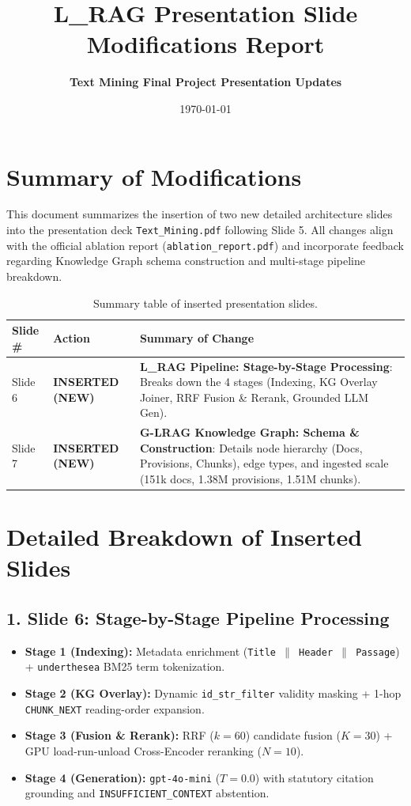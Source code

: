 \documentclass[10pt]{article}
\title{\vspace{-0.5cm}\textbf{\Large L\_RAG Presentation Slide Modifications Report}}
\author{\textbf{Text Mining Final Project Presentation Updates}}
\date{\today}
\begin{document}
\maketitle
\vspace{-0.3cm}

\section*{Summary of Modifications}
This document summarizes the insertion of two new detailed architecture slides into the presentation deck \texttt{Text\_Mining.pdf} following Slide 5. All changes align with the official ablation report (\texttt{ablation\_report.pdf}) and incorporate feedback regarding Knowledge Graph schema construction and multi-stage pipeline breakdown.

\begin{table}[h!]
\centering
\small
\begin{tabular}{lp{3.2cm}p{9cm}}
\toprule
\textbf{Slide \#} & \textbf{Action} & \textbf{Summary of Change} \\
\midrule
Slide 6 & \textbf{INSERTED (NEW)} & \textbf{L\_RAG Pipeline: Stage-by-Stage Processing}: Breaks down the 4 stages (Indexing, KG Overlay Joiner, RRF Fusion \& Rerank, Grounded LLM Gen). \\
Slide 7 & \textbf{INSERTED (NEW)} & \textbf{G-LRAG Knowledge Graph: Schema \& Construction}: Details node hierarchy (Docs, Provisions, Chunks), edge types, and ingested scale (151k docs, 1.38M provisions, 1.51M chunks). \\
\bottomrule
\end{tabular}
\caption{Summary table of inserted presentation slides.}
\end{table}

\vspace{-0.2cm}
\section*{Detailed Breakdown of Inserted Slides}

\subsection*{1. Slide 6: Stage-by-Stage Pipeline Processing}
\begin{itemize}
    \item \textbf{Stage 1 (Indexing):} Metadata enrichment (\texttt{Title $\parallel$ Header $\parallel$ Passage}) + \texttt{underthesea} BM25 term tokenization.
    \item \textbf{Stage 2 (KG Overlay):} Dynamic \texttt{id\_str\_filter} validity masking + 1-hop \texttt{CHUNK\_NEXT} reading-order expansion.
    \item \textbf{Stage 3 (Fusion \& Rerank):} RRF ($k=60$) candidate fusion ($K=30$) + GPU load-run-unload Cross-Encoder reranking ($N=10$).
    \item \textbf{Stage 4 (Generation):} \texttt{gpt-4o-mini} ($T=0.0$) with statutory citation grounding and \texttt{INSUFFICIENT\_CONTEXT} abstention.
\end{itemize}
\end{document}
